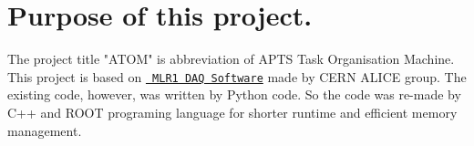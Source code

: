 \chapter{Purpose of this project.}
\hypertarget{md__2home_2ychoi_2ATOM_2README}{}\label{md__2home_2ychoi_2ATOM_2README}
\label{md__2home_2ychoi_2ATOM_2README_autotoc_md0}%
%
The project title "{}\+ATOM"{} is abbreviation of APTS Task Organisation Machine. This project is based on \href{https://gitlab.cern.ch/alice-its3-wp3/apts-dpts-ce65-daq-software}{\texttt{ MLR1 DAQ Software}} made by CERN ALICE group. The existing code, however, was written by Python code. So the code was re-\/made by C++ and ROOT programing language for shorter runtime and efficient memory management. 